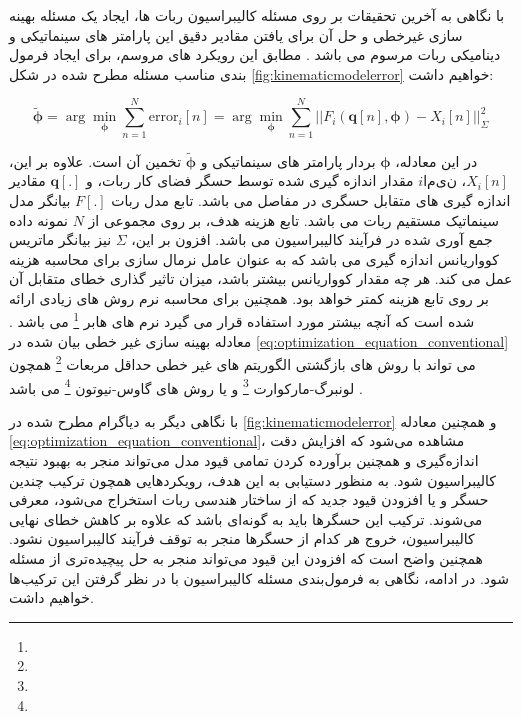 با نگاهی به آخرین تحقیقات بر روی مسئله کالیبراسیون ربات ها، ایجاد یک مسئله بهینه سازی غیرخطی و حل آن برای یافتن مقادیر دقیق این پارامتر های سینماتیکی و دینامیکی ربات مرسوم می باشد
\cite{elatta2004overview,ida2019automatic,ida2022identification,ida2021dynamics}.
مطابق این رویکرد های مروسم، برای ایجاد فرمول بندی مناسب مسئله مطرح شده در شکل \ref{fig:kinematicmodelerror} خواهیم داشت:

\begin{equation}\label{eq:optimization_equation_conventional}
	\tilde{\boldsymbol{\phi}} =  \arg\min_{\boldsymbol{\phi}} \sum_{n = 1 }^{N} \text{error}_i[n] = \arg\min_{\boldsymbol{\phi}} \sum_{n = 1}^{N} ||F_i(\boldsymbol{q}[n], \boldsymbol{\phi}) - X_i[n]||^2_{\Sigma}
\end{equation}

در این معادله، $\boldsymbol{\phi}$ بردار پارامتر های سینماتیکی و $\tilde{\boldsymbol{\phi}}$ تخمین آن است. علاوه بر این، $X_i[n]$، 
$iامین$
مقدار اندازه گیری شده توسط حسگر فضای کار ربات، و $\boldsymbol{q}[.]$ مقادیر اندازه گیری های متقابل حسگری در مفاصل می باشد. تابع مدل ربات $F[.]$ بیانگر مدل سینماتیک مستقیم ربات می باشد. تابع هزینه هدف، بر روی مجموعی از $N$ نمونه داده جمع آوری شده در فرآیند کالیبراسیون می باشد. افزون بر این، $\Sigma$ نیز بیانگر ماتریس کوواریانس اندازه گیری می باشد که به عنوان عامل نرمال سازی برای محاسبه هزینه عمل می کند. هر چه مقدار کوواریانس بیشتر باشد، میزان تاثیر گذاری خطای متقابل آن بر روی تابع هزینه کمتر خواهد بود. همچنین برای محاسبه نرم روش های زیادی ارائه شده است که آنچه بیشتر مورد استفاده قرار می گیرد نرم های هابر 
\footnote{}
می باشد
\cite{chang2015huber}.
معادله بهینه سازی غیر خطی بیان شده در 
\ref{eq:optimization_equation_conventional}
می تواند با روش های بازگشتی الگوریتم های غیر خطی حداقل مربعات
\footnote{}
همچون  لونبرگ-مارکوارت
\footnote{}
و یا روش های گاوس-نیوتون
\footnote{}
می باشد
\cite{dellart_robot_perception}.

با نگاهی دیگر به دیاگرام مطرح شده در 
\ref{fig:kinematicmodelerror}
و همچنین معادله 
\ref{eq:optimization_equation_conventional}،
مشاهده می‌شود که افزایش دقت اندازه‌گیری و همچنین برآورده کردن تمامی قیود مدل می‌تواند منجر به بهبود نتیجه کالیبراسیون شود. به منظور دستیابی به این هدف، رویکردهایی همچون ترکیب چندین حسگر و یا افزودن قیود جدید که از ساختار هندسی ربات استخراج می‌شود، معرفی می‌شوند. ترکیب این حسگرها باید به گونه‌ای باشد که علاوه بر کاهش خطای نهایی کالیبراسیون، خروج هر کدام از حسگرها منجر به توقف فرآیند کالیبراسیون نشود. همچنین واضح است که افزودن این قیود می‌تواند منجر به حل پیچیده‌تری از مسئله شود. در ادامه، نگاهی به فرمول‌بندی مسئله کالیبراسیون با در نظر گرفتن این ترکیب‌ها خواهیم داشت.

